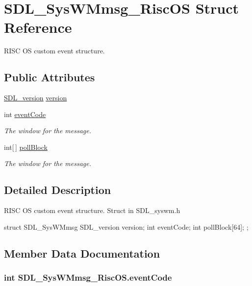 \hypertarget{struct_s_d_l___sys_w_mmsg___risc_o_s}{
\section{SDL\_\-SysWMmsg\_\-RiscOS Struct Reference}
\label{struct_s_d_l___sys_w_mmsg___risc_o_s}
}


RISC OS custom event structure.  


\subsection*{Public Attributes}
\begin{DoxyCompactItemize}
\item 
\hyperlink{struct_s_d_l__version}{SDL\_\-version} \hyperlink{struct_s_d_l___sys_w_mmsg___risc_o_s_a94d601d905191552ef3635e28e266857}{version}
\item 
int \hyperlink{struct_s_d_l___sys_w_mmsg___risc_o_s_acd14001482921411c2a6a3d15c43e792}{eventCode}
\begin{DoxyCompactList}\small\item\em The window for the message. \item\end{DoxyCompactList}\item 
int\mbox{[}$\,$\mbox{]} \hyperlink{struct_s_d_l___sys_w_mmsg___risc_o_s_a25f68ce4afc24def27a7b228f80565c0}{pollBlock}
\begin{DoxyCompactList}\small\item\em The window for the message. \item\end{DoxyCompactList}\end{DoxyCompactItemize}


\subsection{Detailed Description}
RISC OS custom event structure. Struct in SDL\_\-syswm.h 
\begin{DoxyCode}
            struct SDL_SysWMmsg {
                SDL_version version;
                int eventCode;
            int pollBlock[64];
            };          
\end{DoxyCode}
  

\subsection{Member Data Documentation}
\hypertarget{struct_s_d_l___sys_w_mmsg___risc_o_s_acd14001482921411c2a6a3d15c43e792}{
\subsubsection[{eventCode}]{\setlength{\rightskip}{0pt plus 5cm}int {\bf SDL\_\-SysWMmsg\_\-RiscOS.eventCode}}}
\label{struct_s_d_l___sys_w_mmsg___risc_o_s_acd14001482921411c2a6a3d15c43e792}


